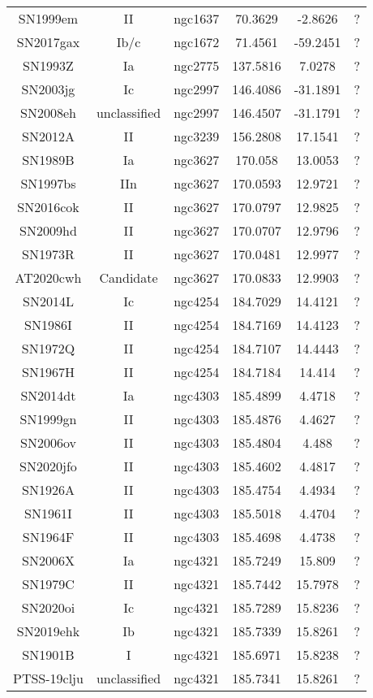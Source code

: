 \begin{table}
\begin{tabular}{cccccc}
SN1999em & II & ngc1637 & 70.3629 & -2.8626 & ? \\
SN2017gax & Ib/c & ngc1672 & 71.4561 & -59.2451 & ? \\
SN1993Z & Ia & ngc2775 & 137.5816 & 7.0278 & ? \\
SN2003jg & Ic & ngc2997 & 146.4086 & -31.1891 & ? \\
SN2008eh & unclassified & ngc2997 & 146.4507 & -31.1791 & ? \\
SN2012A & II & ngc3239 & 156.2808 & 17.1541 & ? \\
SN1989B & Ia & ngc3627 & 170.058 & 13.0053 & ? \\
SN1997bs & IIn & ngc3627 & 170.0593 & 12.9721 & ? \\
SN2016cok & II & ngc3627 & 170.0797 & 12.9825 & ? \\
SN2009hd & II & ngc3627 & 170.0707 & 12.9796 & ? \\
SN1973R & II & ngc3627 & 170.0481 & 12.9977 & ? \\
AT2020cwh & Candidate & ngc3627 & 170.0833 & 12.9903 & ? \\
SN2014L & Ic & ngc4254 & 184.7029 & 14.4121 & ? \\
SN1986I & II & ngc4254 & 184.7169 & 14.4123 & ? \\
SN1972Q & II & ngc4254 & 184.7107 & 14.4443 & ? \\
SN1967H & II & ngc4254 & 184.7184 & 14.414 & ? \\
SN2014dt & Ia & ngc4303 & 185.4899 & 4.4718 & ? \\
SN1999gn & II & ngc4303 & 185.4876 & 4.4627 & ? \\
SN2006ov & II & ngc4303 & 185.4804 & 4.488 & ? \\
SN2020jfo & II & ngc4303 & 185.4602 & 4.4817 & ? \\
SN1926A & II & ngc4303 & 185.4754 & 4.4934 & ? \\
SN1961I & II & ngc4303 & 185.5018 & 4.4704 & ? \\
SN1964F & II & ngc4303 & 185.4698 & 4.4738 & ? \\
SN2006X & Ia & ngc4321 & 185.7249 & 15.809 & ? \\
SN1979C & II & ngc4321 & 185.7442 & 15.7978 & ? \\
SN2020oi & Ic & ngc4321 & 185.7289 & 15.8236 & ? \\
SN2019ehk & Ib & ngc4321 & 185.7339 & 15.8261 & ? \\
SN1901B & I & ngc4321 & 185.6971 & 15.8238 & ? \\
PTSS-19clju & unclassified & ngc4321 & 185.7341 & 15.8261 & ? \\

\end{tabular}
\end{table}
